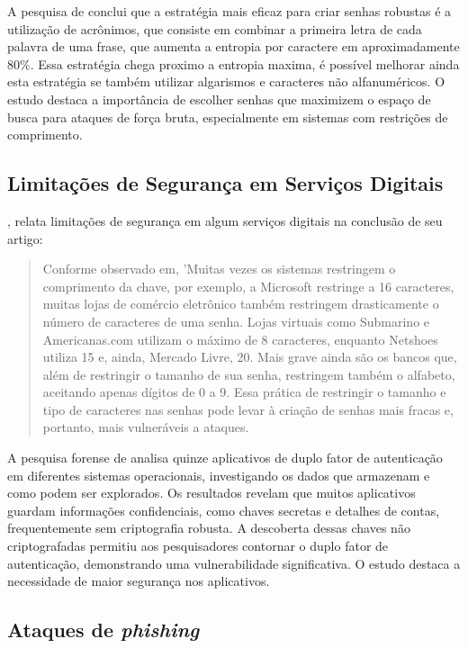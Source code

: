 \documentclass[12pt]{article}
\begin{document}
A pesquisa de \cite{article:1} conclui que a estratégia mais eficaz para criar senhas
robustas é a utilização de acrônimos, que consiste em combinar a primeira letra de
cada palavra de uma frase, que aumenta a entropia por caractere em aproximadamente 80\%.
Essa estratégia chega proximo a entropia maxima, é possível melhorar ainda esta
estratégia se também utilizar algarismos e caracteres não alfanuméricos.
O estudo destaca a importância de escolher senhas que maximizem o espaço
de busca para ataques de força bruta, especialmente em sistemas com
restrições de comprimento.

\subsection{Limitações de Segurança em Serviços Digitais}

\cite{article:1}, relata limitações de segurança em algum serviços
digitais na conclusão de seu artigo:
\begin{quote}
  Conforme observado em, 'Muitas vezes os sistemas restringem o comprimento da chave, por exemplo, a
  Microsoft restringe a 16 caracteres, muitas lojas de comércio eletrônico também restringem drasticamente o
  número de caracteres de uma senha. Lojas virtuais como Submarino e Americanas.com utilizam o máximo de 8
  caracteres, enquanto Netshoes utiliza 15 e, ainda, Mercado Livre, 20. Mais grave ainda são os bancos que,
  além de restringir o tamanho de sua senha, restringem também o alfabeto, aceitando apenas dígitos de 0 a 9.
  Essa prática de restringir o tamanho e tipo de caracteres nas senhas pode levar à criação de senhas mais
  fracas e, portanto, mais vulneráveis a ataques. \cite{article:1}
\end{quote}

A pesquisa forense de \cite{article:2} analisa quinze aplicativos de duplo fator de
autenticação em diferentes sistemas operacionais, investigando os dados que armazenam
e como podem ser explorados.
Os resultados revelam que muitos aplicativos guardam informações confidenciais, como
chaves secretas e detalhes de contas, frequentemente sem criptografia robusta.
A descoberta dessas chaves não criptografadas permitiu aos pesquisadores contornar o 
duplo fator de autenticação, demonstrando uma vulnerabilidade significativa.
O estudo destaca a necessidade de maior segurança nos aplicativos.

\subsection{Ataques de \textit{phishing}}
\end{document}
